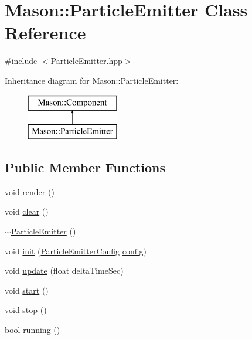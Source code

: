 \hypertarget{class_mason_1_1_particle_emitter}{}\section{Mason\+:\+:Particle\+Emitter Class Reference}
\label{class_mason_1_1_particle_emitter}


{\ttfamily \#include $<$Particle\+Emitter.\+hpp$>$}

Inheritance diagram for Mason\+:\+:Particle\+Emitter\+:\begin{figure}[H]
\begin{center}
\leavevmode
\includegraphics[height=2.000000cm]{class_mason_1_1_particle_emitter}
\end{center}
\end{figure}
\subsection*{Public Member Functions}
\begin{DoxyCompactItemize}
\item 
void \hyperlink{class_mason_1_1_particle_emitter_aa3b6ee77d7b15e2064003d8f75d53774}{render} ()
\item 
void \hyperlink{class_mason_1_1_particle_emitter_a14b63dca4ee3812ffb68f8927956683d}{clear} ()
\item 
\hyperlink{class_mason_1_1_particle_emitter_a6f4952f7555ede99d74d42b30c80f3e2}{$\sim$\+Particle\+Emitter} ()
\item 
void \hyperlink{class_mason_1_1_particle_emitter_a31dbabbe960449bcc71ac94f0421a07f}{init} (\hyperlink{struct_mason_1_1_particle_emitter_config}{Particle\+Emitter\+Config} \hyperlink{class_mason_1_1_particle_emitter_a86af1c5bfa7b301f334473b458d16ba0}{config})
\item 
void \hyperlink{class_mason_1_1_particle_emitter_a34da56b84fe4810c701f4b1541e079dc}{update} (float delta\+Time\+Sec)
\item 
void \hyperlink{class_mason_1_1_particle_emitter_aba4bcba68194e57b715779426ce68a19}{start} ()
\item 
void \hyperlink{class_mason_1_1_particle_emitter_a4843aa3afd1c4d49c9c2519837fffe81}{stop} ()
\item 
bool \hyperlink{class_mason_1_1_particle_emitter_acaf3e09e8eb747d3c603c225a781b5ff}{running} ()
\end{DoxyCompactItemize}
